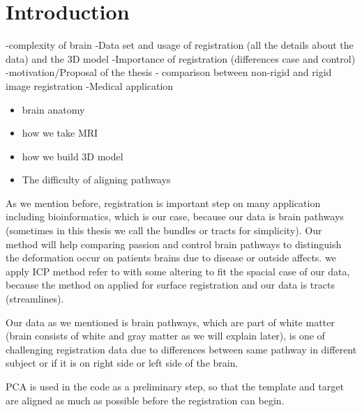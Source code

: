\documentclass[../structure.tex]{subfiles}
\begin{document}
\chapter{Introduction}

-complexity of brain
-Data set and usage of registration (all the details about the data) and the 3D model
-Importance of registration (differences case and control)
-motivation/Proposal of the thesis - comparison between non-rigid and rigid image registration 
-Medical application

\begin{itemize}
\item brain anatomy
\item how we take MRI
\item how we build 3D model
\item The difficulty of aligning pathways

\end{itemize}

As we mention before, registration is important step on many application including bioinformatics, which is our case, because our data is brain pathways (sometimes in this thesis we call the bundles or tracts for simplicity). Our method will help comparing passion and control brain pathways to distinguish the deformation occur on patients brains due to disease or outside affects. we apply ICP method refer to \cite{Amberg2007} with some altering to fit the spacial case of our data, because the method on \cite{Amberg2007} applied for surface registration and our data is tracts (streamlines).

Our data as we mentioned is brain pathways, which are part of white matter (brain consists of white and gray matter as we will explain later), is one of challenging registration data due to differences between same pathway in different subject or if it is on right side or left side of the brain.


PCA is used in the code as a preliminary step, so that the template and target are aligned as much as possible before the registration can begin.
\end{document}
